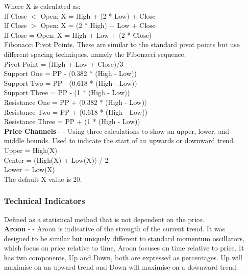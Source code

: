 \documentclass[conference]{IEEEtran}
\begin{document}
\noindent
Where X is calculated as: \\
If Close $<$ Open: X = High + (2 * Low) + Close\\
If Close $>$ Open: X = (2 * High) + Low + Close\\
If Close = Open: X = High + Low + (2 * Close)\\

\noindent
Fibonacci Pivot Points. These are similar to the standard pivot points but use different spacing techniques, namely the Fibonacci sequence.\\
Pivot Point = (High + Low + Close)/3\\
Support One = PP - (0.382 * (High  -  Low))\\
Support Two = PP - (0.618 * (High  -  Low))\\
Support Three = PP - (1 * (High  -  Low))\\
Resistance One = PP + (0.382 * (High  -  Low))\\
Resistance Two = PP + (0.618 * (High  -  Low))\\
Resistance Three = PP + (1 * (High  -  Low))\\

\noindent
\textbf{Price Channels} - \cite{Murphy1999} - Using three calculations to show an upper, lower, and middle bounds. Used to indicate the start of an upwards or downward trend.\\

\noindent
Upper = High(X)\\
Center = (High(X) + Low(X)) / 2\\
Lower = Low(X)\\
The default X value is 20.\\

\subsubsection{Technical Indicators} Defined as a statistical method that is not dependent on the price. \\

\textbf{Aroon} - \cite{Chande1994} - Aroon is indicative of the strength of the current trend. It was designed to be similar but uniquely different to standard momentum oscillators, which focus on price relative to time, Aroon focuses on time relative to price. It has two components, Up and Down, both are expressed as percentages. Up will maximise on an upward trend and Down will maximise on a downward trend.\\
\end{document}
